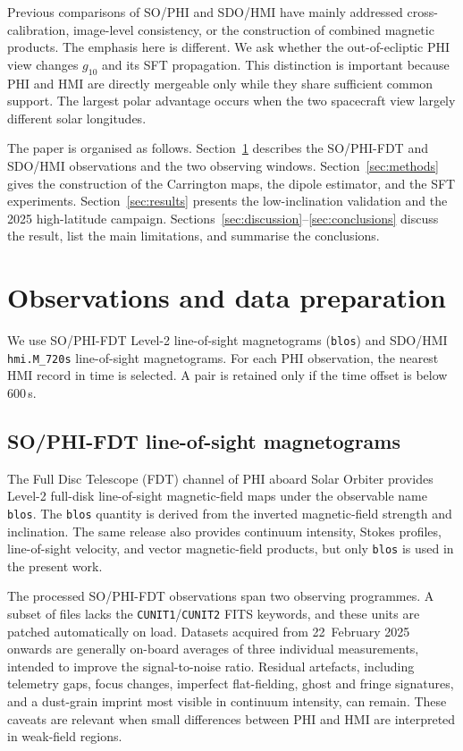 \documentclass{aa}
\begin{document}
Previous comparisons of SO/PHI and SDO/HMI have mainly addressed cross-calibration, image-level consistency, or the construction of combined magnetic products. The emphasis here is different. We ask whether the out-of-ecliptic PHI view changes $g_{10}$ and its SFT propagation. This distinction is important because PHI and HMI are directly mergeable only while they share sufficient common support. The largest polar advantage occurs when the two spacecraft view largely different solar longitudes.

The paper is organised as follows. Section~\ref{sec:data} describes the SO/PHI-FDT and SDO/HMI observations and the two observing windows. Section~\ref{sec:methods} gives the construction of the Carrington maps, the dipole estimator, and the SFT experiments. Section~\ref{sec:results} presents the low-inclination validation and the 2025 high-latitude campaign. Sections~\ref{sec:discussion}--\ref{sec:conclusions} discuss the result, list the main limitations, and summarise the conclusions.

\section{Observations and data preparation}
\label{sec:data}

We use SO/PHI-FDT Level-2 line-of-sight magnetograms (\texttt{blos}) and SDO/HMI \texttt{hmi.M\_720s} line-of-sight magnetograms. For each PHI observation, the nearest HMI record in time is selected. A pair is retained only if the time offset is below 600\,s.

\subsection{SO/PHI-FDT line-of-sight magnetograms}
\label{sec:data-phi}

The Full Disc Telescope (FDT) channel of PHI aboard Solar Orbiter \citep{Solanki2020} provides Level-2 full-disk line-of-sight magnetic-field maps under the observable name \texttt{blos}. The \texttt{blos} quantity is derived from the inverted magnetic-field strength and inclination. The same release also provides continuum intensity, Stokes profiles, line-of-sight velocity, and vector magnetic-field products, but only \texttt{blos} is used in the present work.

The processed SO/PHI-FDT observations span two observing programmes. A subset of files lacks the \texttt{CUNIT1}/\texttt{CUNIT2} FITS keywords, and these units are patched automatically on load. Datasets acquired from 22~February 2025 onwards are generally on-board averages of three individual measurements, intended to improve the signal-to-noise ratio. Residual artefacts, including telemetry gaps, focus changes, imperfect flat-fielding, ghost and fringe signatures, and a dust-grain imprint most visible in continuum intensity, can remain. These caveats are relevant when small differences between PHI and HMI are interpreted in weak-field regions.
\end{document}
